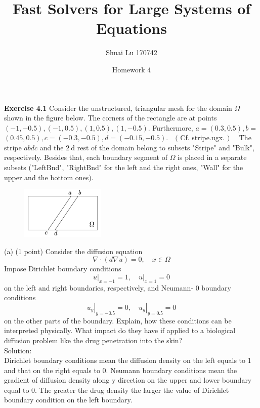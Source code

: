 \documentclass[a4paper]{article}
\title{Fast Solvers for Large Systems of Equations}
\author{Shuai Lu 170742}
\date{Homework 4}
\begin{document}
\maketitle
\noindent \textbf{Exercise 4.1}  Consider the unstructured, triangular mesh for the domain $\Omega$ shown in the figure below. The corners of the rectangle are at points $(-1,-0.5),(-1,0.5),(1,0.5),(1,-0.5)$. Furthermore, $a=(0.3,0.5), b=$ $(0.45,0.5), c=(-0.3,-0.5), d=(-0.15,-0.5) . \quad($ Cf. stripe.ugx. $) \quad$ The stripe $a b d c$ and the $2 \mathrm{~d}$ rest of the domain belong to subsets "Stripe" and "Bulk", respectively. Besides that, each boundary segment of $\Omega$ is placed in a separate subsets ("LeftBnd", "RightBnd" for the left and the right ones, "Wall" for the upper and the bottom ones).\\

\begin{figure}[htbp]
	\centering
	\begin{minipage}[t]{0.7\textwidth}
		\centering		\includegraphics[width=4cm]{1.png}
	\end{minipage}
\end{figure}

\noindent (a) (1 point) Consider the diffusion equation
$$
\nabla \cdot(d \nabla u)=0, \quad x \in \Omega
$$
Impose Dirichlet boundary conditions
$$
\left.u\right|_{x=-1}=1,\left.\quad u\right|_{x=1}=0
$$
on the left and right boundaries, respectively, and Neumann- 0 boundary conditions
$$
\left.u_{y}\right|_{y=-0.5}=0,\left.\quad u_{y}\right|_{y=0.5}=0
$$
on the other parts of the boundary. Explain, how these conditions can be interpreted physically. What impact do they have if applied to a biological diffusion problem like the drug penetration into the skin?\\

\noindent Solution:\\
\noindent Dirichlet boundary conditions mean the diffusion density on the left equals to 1 and that on the right equals to 0. Neumann boundary conditions mean the gradient of diffusion density along y direction on the upper and lower boundary equal to 0. The greater the drug density the larger the value of Dirichlet boundary condition on the left boundary. \\
\end{document}
